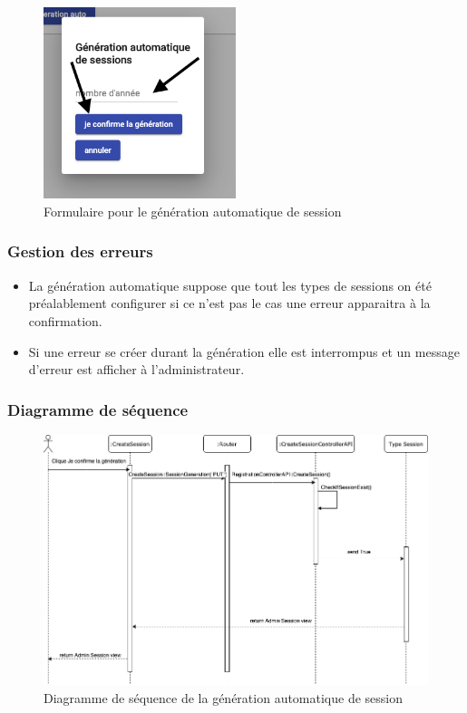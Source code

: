 \vspace{\baselineskip}
\begin{figure}[h]
	\includegraphics[width=0.5\textwidth,center]{Figures/us16-3}
	\caption{Formulaire pour le génération automatique de session}
\end{figure}

\newpage
\subsubsection{Gestion des erreurs}
	\begin{itemize}
		\item La génération automatique suppose que tout les types de sessions on été préalablement configurer si ce n'est pas le cas une erreur apparaitra à la confirmation.
		\item Si une erreur se créer durant la génération elle est interrompus et un message d'erreur est afficher à l'administrateur.
	\end{itemize}
	
\vspace{\baselineskip}
\vspace{\baselineskip}
\subsubsection{Diagramme de séquence}
	\begin{figure}[h]
		\includegraphics[width=\textwidth,center]{Diagramme/sequence-us16}
		\caption{Diagramme de séquence de la génération automatique de session}
	\end{figure}
	
